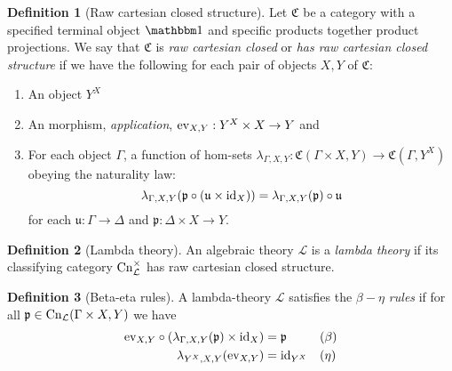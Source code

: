 \documentclass[12pt,twoside]{reedthesis}
\theoremstyle{definition}
\newtheorem{definition}{Definition}
\theoremstyle{remark}
\theoremstyle{plain}
\begin{document}
\newcommand{\cnprod}{\cn_{\mathcal{L}}^{\times}}
\begin{definition}[Raw cartesian closed structure]
  Let \( \mathfrak{C} \) be a category with a specified terminal object
  \( \termob \) and specific products together product projections. We say that
  \( \mathfrak{C} \) is \emph{raw cartesian closed} or \emph{has raw cartesian
    closed structure} if we have the following for each pair of objects
  \( X, Y \) of \( \mathfrak{C} \):
  \begin{enumerate}
    \item An object \( Y^{X} \)
    \item An morphism, \emph{application}, \( \textrm{ev}_{X,Y} : Y^{X} \times X \rightarrow Y \) and
    \item For each object \( \Gamma \), a function of hom-sets
          \( \lambda_{\Gamma, X, Y} : \mathfrak{C}(\Gamma \times X, Y) \rightarrow \mathfrak{C}(\Gamma, Y^{X})\) obeying
          the naturality law:
          \[
            \lambda_{\Gamma, X, Y} ( \mathfrak{p} \circ (\mathfrak{u} \times \textrm{id}_{X})) = \lambda_{\Gamma, X, Y}(\mathfrak{p}) \circ \mathfrak{u}
          \]
          for each \( \mathfrak{u} : \Gamma \rightarrow \Delta \) and
          \( \mathfrak{p} : \Delta \times X \rightarrow Y \).
  \end{enumerate}
\end{definition}

\begin{definition}[Lambda theory]
  An algebraic theory $\mathcal{L}$ is a \emph{lambda theory} if its classifying
  category \( \cnprod \) has raw cartesian closed structure.
\end{definition}

\begin{definition}[Beta-eta rules]
  A lambda-theory $\mathcal{L}$ satisfies the \emph{$\beta-\eta$ rules} if for all
  \( \mathfrak{p} \in \mathrm{Cn}_{\mathcal{L}}(\Gamma \times X,Y) \) we have
  \begin{align*}
    \textrm{ev}_{X,Y} \circ (\lambda_{\Gamma,X,Y}(\mathfrak{p}) \times \textrm{id}_{X}) &= \mathfrak{p} && (\beta) \\
    \lambda_{Y^{X},X,Y}(\textrm{ev}_{X,Y}) &= \textrm{id}_{Y^{X}} && (\eta)\\
  \end{align*}
\end{definition}
\end{document}
